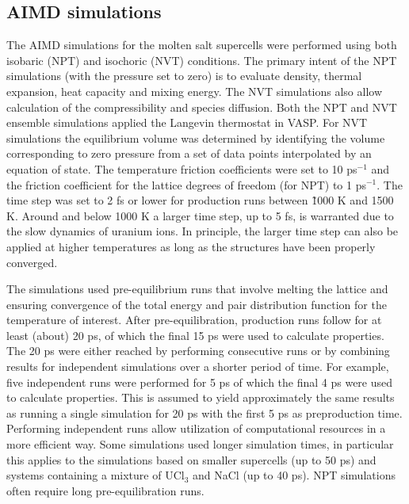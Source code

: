 \documentclass[preprint,3p,10pt,twocolumn,number,sort&compress]{elsarticle}
\begin{document}

\subsection{AIMD simulations}
The AIMD simulations for the molten salt supercells were performed using both isobaric (NPT) and isochoric (NVT) conditions. The primary intent of the NPT simulations (with the pressure set to zero) is to evaluate density, thermal expansion, heat capacity and mixing energy. The NVT simulations also allow calculation of the compressibility and species diffusion. Both the NPT and NVT ensemble simulations applied the Langevin thermostat in VASP. For NVT simulations the equilibrium volume was determined by identifying the volume corresponding to zero pressure from a set of data points interpolated by an equation of state. 
The temperature friction coefficients were set to 10 ps$^{-1}$ and the friction coefficient for the lattice degrees of freedom (for NPT) to 1 ps$^{-1}$. The time step was set to 2 fs or lower for production runs between \~1000 K and 1500 K. Around and below 1000 K a larger time step, up to 5 fs, is warranted due to the slow dynamics of uranium ions. In principle, the larger time step can also be applied at higher temperatures as long as the structures have been properly converged. 

The simulations used pre-equilibrium runs that involve melting the lattice and ensuring convergence of the total energy and pair distribution function for the temperature of interest. After pre-equilibration, production runs follow for at least (about) 20 ps, of which the final 15 ps were used to calculate properties. The 20 ps were either reached by performing consecutive runs or by combining results for independent simulations over a shorter period of time. For example, five independent runs were performed for 5 ps of which the final 4 ps were used to calculate properties. This is assumed to yield approximately the same results as running a single simulation for 20 ps with the first 5 ps as preproduction time. Performing independent runs allow utilization of computational resources in a more efficient way. Some simulations used longer simulation times, in particular this applies to the simulations based on smaller supercells (up to 50 ps) and systems containing a mixture of UCl$_3$ and NaCl (up to 40 ps). NPT simulations often require long pre-equilibration runs. 
\end{document}
